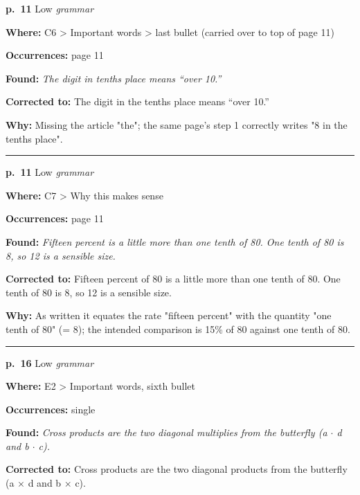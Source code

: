 \documentclass[11pt]{article}
\newcommand{\sevlow}[1]{\textcolor{black!55}{#1}}
\begin{document}
\noindent\textbf{p.~11} \quad \sevlow{Low} \quad \textit{grammar}\par
\noindent\textbf{Where: }C6 > Important words > last bullet (carried over to top of page 11)\par
\noindent\textbf{Occurrences: }page 11\par
\noindent\textbf{Found: }\textit{The digit in tenths place means ``over 10.''}\par
\noindent\textbf{Corrected to: }The digit in the tenths place means ``over 10.''\par
\noindent\textbf{Why: }Missing the article "the"; the same page's step 1 correctly writes "8 in the tenths place".\par\vspace{4pt}
\noindent\rule{\textwidth}{0.4pt}\par\nobreak\vspace{2pt}
\noindent\textbf{p.~11} \quad \sevlow{Low} \quad \textit{grammar}\par
\noindent\textbf{Where: }C7 > Why this makes sense\par
\noindent\textbf{Occurrences: }page 11\par
\noindent\textbf{Found: }\textit{Fifteen percent is a little more than one tenth of 80. One tenth of 80 is 8, so 12 is a sensible size.}\par
\noindent\textbf{Corrected to: }Fifteen percent of 80 is a little more than one tenth of 80. One tenth of 80 is 8, so 12 is a sensible size.\par
\noindent\textbf{Why: }As written it equates the rate "fifteen percent" with the quantity "one tenth of 80" (= 8); the intended comparison is 15\% of 80 against one tenth of 80.\par\vspace{4pt}
\noindent\rule{\textwidth}{0.4pt}\par\nobreak\vspace{2pt}
\noindent\textbf{p.~16} \quad \sevlow{Low} \quad \textit{grammar}\par
\noindent\textbf{Where: }E2 > Important words, sixth bullet\par
\noindent\textbf{Occurrences: }single\par
\noindent\textbf{Found: }\textit{Cross products are the two diagonal multiplies from the butterfly (a $\cdot$ d and b $\cdot$ c).}\par
\noindent\textbf{Corrected to: }Cross products are the two diagonal products from the butterfly (a $\times$ d and b $\times$ c).\par
\end{document}
